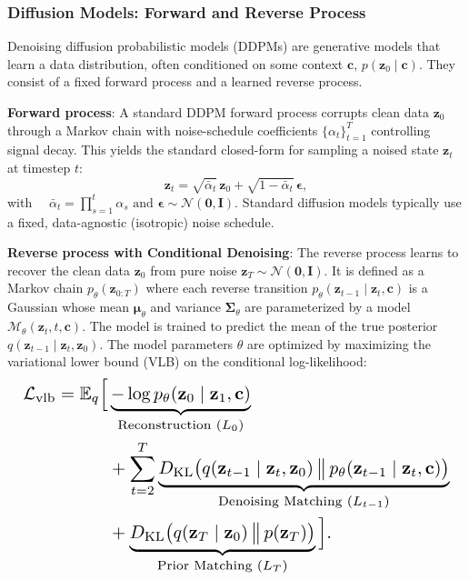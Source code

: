 \subsubsection{Diffusion Models: Forward and Reverse Process}

\noindent Denoising diffusion probabilistic models (DDPMs) are generative models that learn a data distribution, often conditioned on some context $\mathbf{c}$, $p(\mathbf{z}_0 \mid \mathbf{c})$. They consist of a fixed forward process and a learned reverse process.

\noindent \textbf{Forward process}: A standard DDPM forward process corrupts clean data $\mathbf{z}_0$ through a Markov chain with noise-schedule coefficients $\{\alpha_t\}_{t=1}^T$ controlling signal decay. This yields the standard closed-form for sampling a noised state $\mathbf{z}_t$ at timestep $t$:
\begin{equation}
    \mathbf{z}_t = \sqrt{\bar{\alpha}_t}\,\mathbf{z}_0 + \sqrt{1 - \bar{\alpha}_t}\,\boldsymbol{\epsilon},
\end{equation}
with $\quad \bar{\alpha}_t = \prod_{s=1}^t \alpha_s \text{ and } \boldsymbol{\epsilon}\sim\mathcal{N}(\mathbf 0,\mathbf I)$. Standard diffusion models typically use a fixed, data-agnostic (isotropic) noise schedule.

\noindent \textbf{Reverse process with Conditional Denoising}: The reverse process learns to recover the clean data $\mathbf{z}_0$ from pure noise $\mathbf{z}_T \sim \mathcal{N}(\mathbf 0,\mathbf I)$. It is defined as a Markov chain $p_\theta(\mathbf{z}_{0:T})$ where each reverse transition $p_\theta(\mathbf{z}_{t-1} \mid \mathbf{z}_t, \mathbf{c})$ is a Gaussian whose mean $\boldsymbol{\mu}_\theta$ and variance $\boldsymbol{\Sigma}_\theta$ are parameterized by a model $\mathcal{M}_\theta(\mathbf{z}_t, t, \mathbf{c})$. The model is trained to predict the mean of the true posterior $q(\mathbf{z}_{t-1} \mid \mathbf{z}_t, \mathbf{z}_0)$. The model parameters $\theta$ are optimized by maximizing the variational lower bound (VLB) on the conditional log-likelihood:
\begin{equation}
\resizebox{\columnwidth}{!}{
$
\begin{aligned}
\mathcal{L}_{\text{vlb}} 
= \mathbb{E}_{q} \Big[
    &\underbrace{-\log p_\theta(\mathbf{z}_0 \mid \mathbf{z}_1, \mathbf{c})}_{\text{Reconstruction } (L_0)} \\
    & + \sum_{t=2}^{T} 
        \underbrace{D_{\mathrm{KL}}\!\left(
            q(\mathbf{z}_{t-1} \mid \mathbf{z}_t, \mathbf{z}_0)
            \,\big\|\,
            p_\theta(\mathbf{z}_{t-1} \mid \mathbf{z}_t, \mathbf{c})
        \right)}_{\text{Denoising Matching } (L_{t-1})} \\
    &+
        \underbrace{D_{\mathrm{KL}}\!\left(
            q(\mathbf{z}_T \mid \mathbf{z}_0)
            \,\big\|\,
            p(\mathbf{z}_T)
        \right)}_{\text{Prior Matching } (L_T)}
\Big].
\end{aligned}
$
}
\end{equation}

